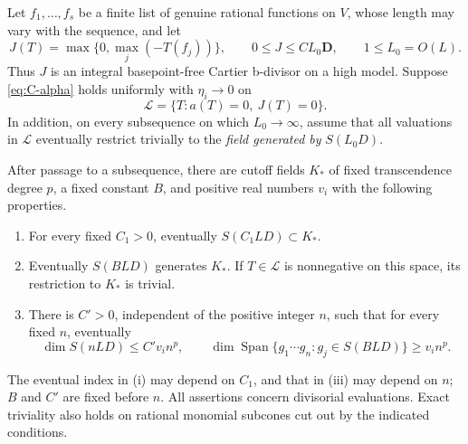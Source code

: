 \begin{lemma}\label{lem:C-saturation-count}
Let $f_1,\ldots,f_s$ be a finite list of genuine rational functions on
$V$, whose length may vary with the sequence, and let
\begin{equation}\label{eq:C-neutral-polarization}
 J(T)=\max\{0,\max_j(-T(f_j))\},\qquad
 0\leq J\leq C L_0\mathbf D,\qquad1\leq L_0=O(L).
\end{equation}
Thus $J$ is an integral basepoint-free Cartier b-divisor on a high
model.  Suppose \eqref{eq:C-alpha} holds uniformly with $\eta_i\to0$
on
\[
                       \mathcal L=\{T:a(T)=0,\ J(T)=0\}.
\]
In addition, on every subsequence on which $L_0\to\infty$, assume
that all valuations in $\mathcal L$ eventually restrict trivially to
the \emph{field generated by} $S(L_0D)$.

After passage to a subsequence, there are cutoff fields $K_*$ of fixed
transcendence degree $p$, a fixed constant $B$, and positive real
numbers $v_i$ with the following properties.
\begin{enumerate}[label=\textup{(\roman*)}]
\item For every fixed $C_1>0$, eventually $S(C_1LD)\subset K_*$.
\item Eventually $S(BLD)$ generates $K_*$.  If $T\in\mathcal L$ is
nonnegative on this space, its restriction to $K_*$ is trivial.
\item There is $C'>0$, independent of the positive integer $n$, such
that for every fixed $n$, eventually
\begin{equation}\label{eq:C-uniform-counts}
 \dim S(nLD)\leq C'v_i n^p,\qquad
 \dim\operatorname{Span}\{g_1\cdots g_n:g_j\in S(BLD)\}
                                      \geq v_i n^p.
\end{equation}
\end{enumerate}
The eventual index in \textup{(i)} may depend on $C_1$, and that in
\textup{(iii)} may depend on $n$; $B$ and $C'$ are fixed before $n$.
All assertions concern divisorial evaluations.  Exact triviality also
holds on rational monomial subcones cut out by the indicated
conditions.
\end{lemma}

